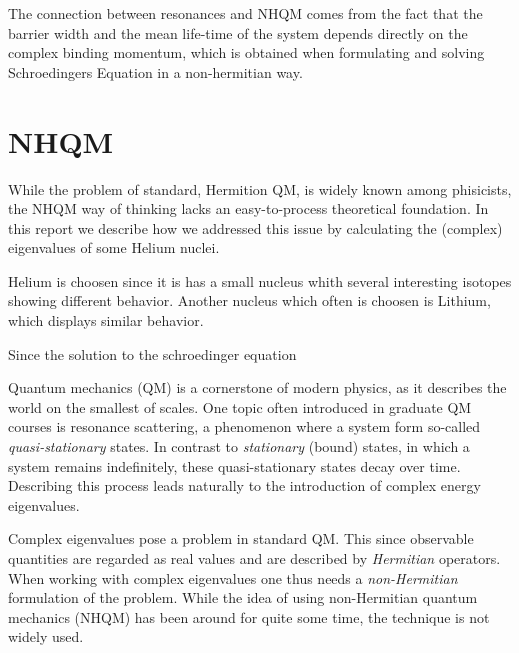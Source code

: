 The connection between resonances and NHQM comes from the fact that the barrier width and the mean life-time of the system depends directly on the complex binding momentum,
which is obtained when formulating and solving Schroedingers Equation in a non-hermitian way.


\section{NHQM}
While the problem of standard, Hermition QM, is widely known among phisicists, the NHQM way of thinking lacks an easy-to-process theoretical foundation.
In this report we describe how we addressed this issue by calculating the (complex) eigenvalues of some Helium nuclei.

Helium is choosen since it is has a small nucleus whith several interesting isotopes showing different behavior.
Another nucleus which often is choosen is Lithium, which displays similar behavior.

Since the solution to the schroedinger equation 








Quantum mechanics (QM) is a cornerstone of modern physics, as it describes the world on the smallest of scales.
One topic often introduced in graduate QM courses is resonance scattering, a phenomenon where a system form so-called \emph{quasi-stationary} states.
In contrast to \emph{stationary} (bound) states, in which a system remains indefinitely, these quasi-stationary states decay over time.
Describing this process leads naturally to the introduction of complex energy eigenvalues. 

Complex eigenvalues pose a problem in standard QM.
This since observable quantities are regarded as real values and are described by \emph{Hermitian} operators.
When working with complex eigenvalues one thus needs a \emph{non-Hermitian} formulation of the problem.
While the idea of using non-Hermitian quantum mechanics (NHQM) has been around for quite some time, the technique is not widely used.
